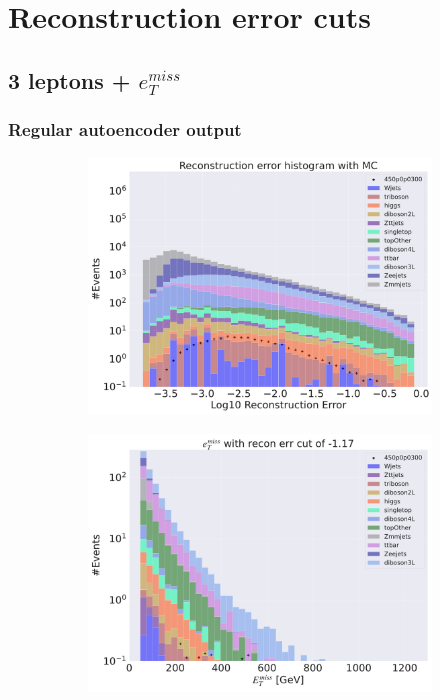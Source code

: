 \section*{Reconstruction error cuts}
\subsection*{3 leptons + $e_T^{miss}$}
\subsubsection*{Regular autoencoder output}
\begin{figure}[H]
    \centering
    \begin{subfigure}{.40\textwidth}
        \includegraphics[width=\textwidth]{Figures/AE_testing/big/3lep/b_data_recon_big_rm3_feats_sig_450p0p0300.pdf}
        \caption{ }
        \label{fig:AE_3lep_big_450_2}
    \end{subfigure}
    \hfill
    \begin{subfigure}{.40\textwidth}
        \includegraphics[width=\textwidth]{Figures/AE_testing/big/3lep/b_data_recon_big_rm3_feats_sig_450p0p0300_etmiss_recon_errcut_-1.17.pdf}

\end{subfigure}
\end{figure}
